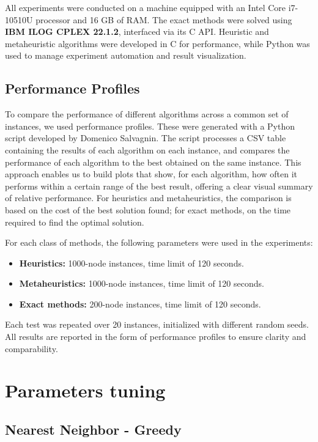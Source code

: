All experiments were conducted on a machine equipped with an Intel Core i7-10510U processor and 16 GB of RAM. The exact methods were solved using \textbf{IBM ILOG CPLEX 22.1.2}, interfaced via its C API. Heuristic and metaheuristic algorithms were developed in C for performance, while Python was used to manage experiment automation and result visualization.

\subsection{Performance Profiles}

To compare the performance of different algorithms across a common set of instances, we used performance profiles. These were generated with a Python script developed by Domenico Salvagnin. The script processes a CSV table containing the results of each algorithm on each instance, and compares the performance of each algorithm to the best obtained on the same instance.
This approach enables us to build plots that show, for each algorithm, how often it performs within a certain range of the best result, offering a clear visual summary of relative performance. For heuristics and metaheuristics, the comparison is based on the cost of the best solution found; for exact methods, on the time required to find the optimal solution.

For each class of methods, the following parameters were used in the experiments:
\begin{itemize}
    \item \textbf{Heuristics:} 1000-node instances, time limit of 120 seconds.
    \item \textbf{Metaheuristics:} 1000-node instances, time limit of 120 seconds.
    \item \textbf{Exact methods:} 200-node instances, time limit of 120 seconds.
    
    
\end{itemize}

Each test was repeated over 20 instances, initialized with different random seeds. All results are reported in the form of performance profiles to ensure clarity and comparability.

\section{Parameters tuning}

\subsection{Nearest Neighbor - Greedy}
\label{ssec:nn-tuning}

